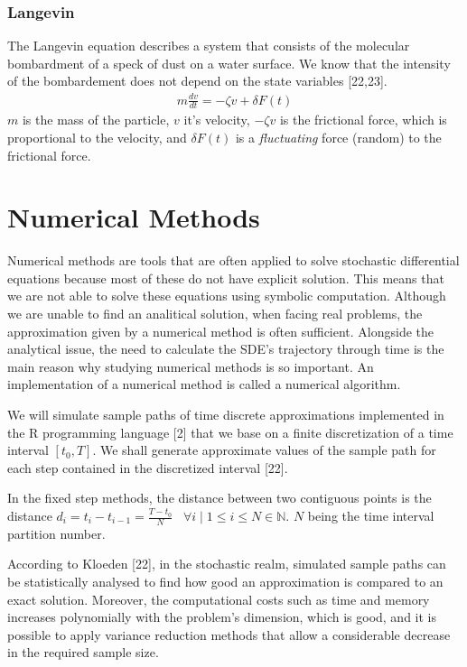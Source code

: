 \documentclass[12pt,twoside]{reedthesis}
\theoremstyle{definition}
\theoremstyle{definition}
\theoremstyle{remark}
\begin{document}
  \subsubsection{Langevin}\label{langevin}
  
  The Langevin equation describes a system that consists of the molecular
  bombardment of a speck of dust on a water surface. We know that the
  intensity of the bombardement does not depend on the state variables
  {[}22,23{]}.
  \begin{align}
  m \frac{dv}{dt} = -\zeta v + \delta F (t) 
  \end{align}
  \(m\) is the mass of the particle, \(v\) it's velocity, \(-\zeta v\) is
  the frictional force, which is proportional to the velocity, and
  \(\delta F (t)\) is a \emph{fluctuating} force (random) to the
  frictional force.
  
  \section{Numerical Methods}\label{numerical-methods}
  
  Numerical methods are tools that are often applied to solve stochastic
  differential equations because most of these do not have explicit
  solution. This means that we are not able to solve these equations using
  symbolic computation. Although we are unable to find an analitical
  solution, when facing real problems, the approximation given by a
  numerical method is often sufficient. Alongside the analytical issue,
  the need to calculate the SDE's trajectory through time is the main
  reason why studying numerical methods is so important. An implementation
  of a numerical method is called a numerical algorithm.
  
  We will simulate sample paths of time discrete approximations
  implemented in the R programming language {[}2{]} that we base on a
  finite discretization of a time interval \([t_0, T]\). We shall generate
  approximate values of the sample path for each step contained in the
  discretized interval {[}22{]}.
  
  In the fixed step methods, the distance between two contiguous points is
  the distance
  \(d_i = t_i - t_{i-1} = \frac{T-t_0}{N} \;\;\; \forall i \mid 1 \leq i \leq N \in \mathbb{N}\).
  \(N\) being the time interval partition number.
  
  According to Kloeden {[}22{]}, in the stochastic realm, simulated sample
  paths can be statistically analysed to find how good an approximation is
  compared to an exact solution. Moreover, the computational costs such as
  time and memory increases polynomially with the problem's dimension,
  which is good, and it is possible to apply variance reduction methods
  that allow a considerable decrease in the required sample size.
  
\end{document}
